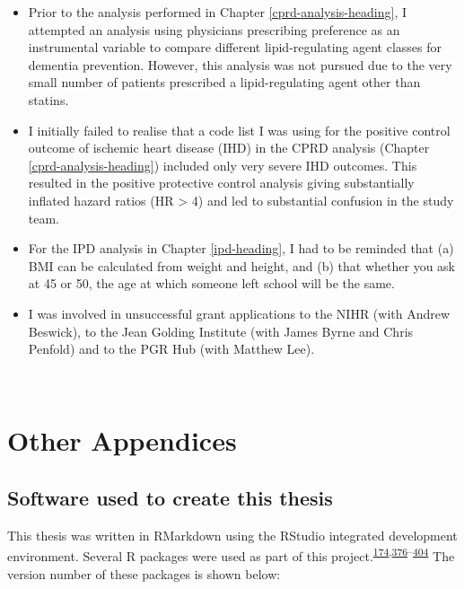 \documentclass[a4paper, twoside]{templates/ociamthesis}
\begin{document}
\begin{itemize}
\item
  Prior to the analysis performed in Chapter \ref{cprd-analysis-heading}, I attempted an analysis using physicians prescribing preference as an instrumental variable to compare different lipid-regulating agent classes for dementia prevention. However, this analysis was not pursued due to the very small number of patients prescribed a lipid-regulating agent other than statins.
\item
  I initially failed to realise that a code list I was using for the positive control outcome of ischemic heart disease (IHD) in the CPRD analysis (Chapter \ref{cprd-analysis-heading}) included only very severe IHD outcomes. This resulted in the positive protective control analysis giving substantially inflated hazard ratios (HR \textgreater{} 4) and led to substantial confusion in the study team.
\item
  For the IPD analysis in Chapter \ref{ipd-heading}, I had to be reminded that (a) BMI can be calculated from weight and height, and (b) that whether you ask at 45 or 50, the age at which someone left school will be the same.
\item
  I was involved in unsuccessful grant applications to the NIHR (with Andrew Beswick), to the Jean Golding Institute (with James Byrne and Chris Penfold) and to the PGR Hub (with Matthew Lee).
\end{itemize}

~

\hypertarget{other-appendix-heading}{%
\chapter{Other Appendices}\label{other-appendix-heading}}

\minitoc 

\newpage

\hypertarget{software-used-to-create-this-thesis}{%
\section{Software used to create this thesis}\label{software-used-to-create-this-thesis}}

This thesis was written in RMarkdown using the RStudio integrated development environment. Several R packages were used as part of this project.\textsuperscript{\protect\hyperlink{ref-R-metafor}{174},\protect\hyperlink{ref-R-base}{376}--\protect\hyperlink{ref-sf2018}{404}} The version number of these packages is shown below:
\end{document}

